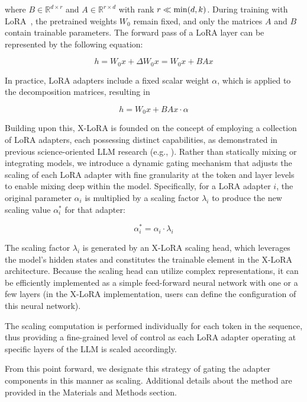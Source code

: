 where $B \in \mathbb{R}^{d \times r}$ and $A \in \mathbb{R}^{r \times d}$ with rank $r \ll {\rm min}(d,k)$. During training with LoRA~\cite{hu2021lora}, the pretrained weights $W_0$ remain fixed, and only the matrices $A$ and $B$ contain trainable parameters. The forward pass of a LoRA layer can be represented by the following equation:

\begin{equation}
    h = W_0x + \Delta W_0x = W_0x + BAx
\end{equation}

In practice, LoRA adapters include a fixed scalar weight $\alpha$, which is applied to the decomposition matrices, resulting in

\begin{equation}
    h = W_0x + BAx \cdot \alpha
\end{equation}

Building upon this, X-LoRA is founded on the concept of employing a collection of LoRA adapters, each possessing distinct capabilities, as demonstrated in previous science-oriented LLM research (e.g., \cite{Buehler2023GenerativeDesign}). Rather than statically mixing or integrating models, we introduce a dynamic gating mechanism that adjusts the scaling of each LoRA adapter with fine granularity at the token and layer levels to enable mixing deep within the model. Specifically, for a LoRA adapter $i$, the original parameter $\alpha_i$ is multiplied by a scaling factor $\lambda_i$ to produce the new scaling value $\alpha^*_i$ for that adapter:

\begin{equation}
    \alpha^*_i = \alpha_i \cdot \lambda_i
\end{equation}

The scaling factor $\lambda_i$ is generated by an X-LoRA scaling head, which leverages the model's hidden states and constitutes the trainable element in the X-LoRA architecture. Because the scaling head can utilize complex representations, it can be efficiently implemented as a simple feed-forward neural network with one or a few layers (in the X-LoRA implementation, users can define the configuration of this neural network).

The scaling computation is performed individually for each token in the sequence, thus providing a fine-grained level of control as each LoRA adapter operating at specific layers of the LLM is scaled accordingly.

From this point forward, we designate this strategy of gating the adapter components in this manner as scaling. Additional details about the method are provided in the Materials and Methods section.

